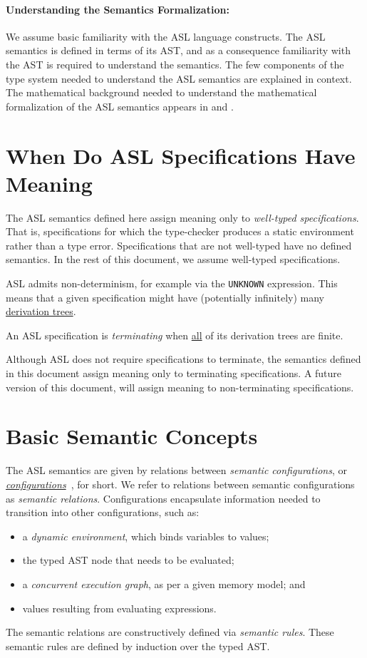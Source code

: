 \documentclass{book}
\begin{document}
\paragraph{Understanding the Semantics Formalization:}
We assume basic familiarity with the ASL language constructs. %
The ASL semantics is defined in terms of its AST,
and as a consequence familiarity with the AST is required to understand the semantics.
The few components of the type system needed to understand the ASL semantics are explained in context.
The mathematical background needed to understand the mathematical formalization
of the ASL semantics appears in  and .

\section{When Do ASL Specifications Have Meaning \label{sec:MeaningfulASLSpecifications}}
The ASL semantics defined here assign meaning only to \emph{well-typed specifications}.
That is, specifications for which the type-checker produces a static environment rather than
a type error.
Specifications that are not well-typed have no defined semantics.
In the rest of this document, we assume well-typed specifications.

ASL admits non-determinism, for example via the \texttt{UNKNOWN} expression.
This means that a given specification might have (potentially infinitely) many
\hyperlink{def-derivationtree}{derivation trees}.

An ASL specification is \emph{terminating} when \underline{all} of its derivation trees are finite.

Although ASL does not require specifications to terminate, the semantics defined in this
document assign meaning only to terminating specifications.
A future version of this document, will assign meaning to non-terminating specifications.

\section{Basic Semantic Concepts}
The ASL semantics are given by relations between \emph{semantic configurations},
or \hyperlink{def-configuration}{\emph{configurations}}~\cite{SemanticsWithApplicationsBook}, for short.
We refer to relations between semantic configurations as \emph{semantic relations}.
Configurations encapsulate information needed to transition into other configurations, such as:
\begin{itemize}
  \item a \emph{dynamic environment}, which binds variables to values;
  \item the typed AST node that needs to be evaluated;
  \item a \emph{concurrent execution graph}, as per a given memory model; and
  \item values resulting from evaluating expressions.
\end{itemize}
The semantic relations are constructively defined via \emph{semantic rules}.
These semantic rules are defined by induction over the typed AST.
\end{document}
